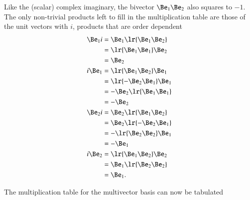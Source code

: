 Like the (scalar) complex imaginary, the bivector \( \Be_1 \Be_2 \) also squares to \( -1 \).
The only non-trivial products left to fill in the  multiplication table are those of the unit vectors with \( i \), products that are order dependent
\begin{dmath}\label{eqn:2dMultiplication:180}
\begin{aligned}
   \Be_1 i &= \Be_1 \lr{ \Be_1 \Be_2 } \\
           &= \lr{ \Be_1 \Be_1 } \Be_2 \\
           &= \Be_2 \\
   i \Be_1 &= \lr{ \Be_1 \Be_2 } \Be_1 \\
           &= \lr{ -\Be_2 \Be_1 } \Be_1 \\
           &= -\Be_2 \lr{ \Be_1 \Be_1 } \\
           &= -\Be_2 \\
   \Be_2 i &= \Be_2 \lr{ \Be_1 \Be_2 } \\
           &= \Be_2 \lr{ -\Be_2 \Be_1 } \\
           &= -\lr{ \Be_2 \Be_2 }\Be_1 \\
           &= -\Be_1 \\
   i \Be_2 &= \lr{ \Be_1 \Be_2 } \Be_2 \\
           &= \Be_1 \lr{ \Be_2 \Be_2 } \\
           &= \Be_1.
\end{aligned}
\end{dmath}

The multiplication table for the  multivector basis can now be tabulated


